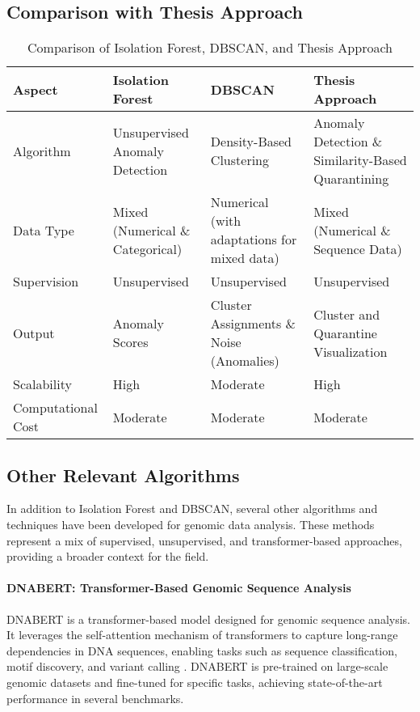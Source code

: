 \subsection{Comparison with Thesis Approach}
\begin{table}[h]
    \centering
    \caption{Comparison of Isolation Forest, DBSCAN, and Thesis Approach}
    \label{tab:comparison}
    \begin{tabular}{|p{2.5cm}|p{2.5cm}|p{2.5cm}|p{2.5cm}|}
    \hline
    \textbf{Aspect} & \textbf{Isolation Forest} & \textbf{DBSCAN} & \textbf{Thesis Approach} \\ \hline
    Algorithm & Unsupervised Anomaly Detection & Density-Based Clustering & Anomaly Detection \& Similarity-Based Quarantining \\ \hline
    Data Type & Mixed (Numerical \& Categorical) & Numerical (with adaptations for mixed data) & Mixed (Numerical \& Sequence Data) \\ \hline
    Supervision & Unsupervised & Unsupervised & Unsupervised \\ \hline
    Output & Anomaly Scores & Cluster Assignments \& Noise (Anomalies) & Cluster and Quarantine Visualization \\ \hline
    Scalability & High & Moderate & High \\ \hline
    Computational Cost & Moderate & Moderate & Moderate \\ \hline
    \end{tabular}
\end{table}


\subsection{Other Relevant Algorithms}
In addition to Isolation Forest and DBSCAN, several other algorithms and techniques have been developed for genomic data analysis. These methods represent a mix of supervised, unsupervised, and transformer-based approaches, providing a broader context for the field.

\paragraph{DNABERT: Transformer-Based Genomic Sequence Analysis}
DNABERT is a transformer-based model designed for genomic sequence analysis. It leverages the self-attention mechanism of transformers to capture long-range dependencies in DNA sequences, enabling tasks such as sequence classification, motif discovery, and variant calling \cite{ji2021dnabert}. DNABERT is pre-trained on large-scale genomic datasets and fine-tuned for specific tasks, achieving state-of-the-art performance in several benchmarks.

